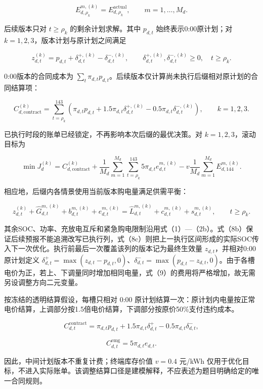 \documentclass[zihao=-4,a4paper,UTF8,fontset=none]{ctexart}
\begin{document}
\[
E_{d,\rho_k}^{m,(k)}=E_{d,\rho_k}^{\mathrm{actual}},\qquad m=1,\ldots,M_d.
\tag{8c}
\]

后续版本只对 \(t\geq\rho_k\) 的剩余计划求解。其中 \(p_{d,t}\) 始终表示0:00原计划；对 \(k=1,2,3\)，版本计划与原计划之间满足

\[
z_{d,t}^{(k)}=p_{d,t}+\delta_{d,t}^{+,(k)}-\delta_{d,t}^{-,(k)},
\qquad \delta_{d,t}^{+,(k)},\delta_{d,t}^{-,(k)}\ge0,\quad t\geq\rho_k.
\tag{8d}
\]

0:00版本的合同成本为 \(\sum_t\pi_{d,t}p_{d,t}\)。后续版本仅计算尚未执行后缀相对原计划的合同结算项：

\[
 C_{d,\mathrm{contract}}^{(k)}=
 \sum_{t=\rho_k}^{143}\left(\pi_{d,t}p_{d,t}
 +1.5\pi_{d,t}\delta_{d,t}^{+,(k)}
 -0.5\pi_{d,t}\delta_{d,t}^{-,(k)}\right),
\qquad k=1,2,3.
\tag{8e}
\]

已执行时段的账单已经锁定，不再影响本次后缀的最优决策。对 \(k=1,2,3\)，滚动目标为

\[
\min J_d^{(k)}=C_{d,\mathrm{contract}}^{(k)}+
\frac{1}{M_d}\sum_{m=1}^{M_d}\sum_{t=\rho_k}^{143}5\pi_{d,t}e_{d,t}^{m,(k)}
-v\frac{1}{M_d}\sum_{m=1}^{M_d}E_{d,144}^{m,(k)}.
\tag{8f}
\]

相应地，后缀内各情景使用当前版本购电量满足供需平衡：

\[
z_{d,t}^{(k)}+\widehat G_{d,t}^{m,(k)}+b_{d,t}^{m,(k)}+e_{d,t}^{m,(k)}
=\widehat L_{d,t}^{m,(k)}+c_{d,t}^{m,(k)}+s_{d,t}^{m,(k)},\qquad t\geq\rho_k.
\tag{8g}
\]

其余SOC、功率、充放电互斥和紧急购电限制沿用式（1）---（2b）。式（8b）保证后续预报不能追溯改写已执行列，式（8c）则把上一执行区间形成的实际SOC传入下一次优化。执行前最后一次覆盖该列的版本记为最终生效量 \(z_{d,t}\)，并相对0:00原计划定义 \(\delta^+_{d,t}=\max(z_{d,t}-p_{d,t},0)\)、\(\delta^-_{d,t}=\max(p_{d,t}-z_{d,t},0)\)。由于各槽电价为正，若上、下调量同时增加相同电量，式（9）的费用将严格增加，故无需另设调整方向二元变量。

按冻结的透明结算假设，每槽只相对 0:00 原计划结算一次：原计划内电量按正常电价结算，上调部分按1.5倍电价结算，下调部分按原价50\%支付违约成本。

\[
C^{\mathrm{contract}}_{d,t}=\pi_{d,t}p_{d,t}+1.5\pi_{d,t}\delta^+_{d,t}-0.5\pi_{d,t}\delta^-_{d,t},
\tag{9}
\]

\[
C^{\mathrm{emg}}_{d,t}=5\pi_{d,t}e_{d,t}.
\tag{10}
\]

因此，中间计划版本不重复计费；终端库存价值 \(v=0.4\) 元/kWh 仅用于优化目标，不进入实际账单。该调整结算口径是建模解释，不应表述为题目明确给定的唯一合同规则。
\end{document}
